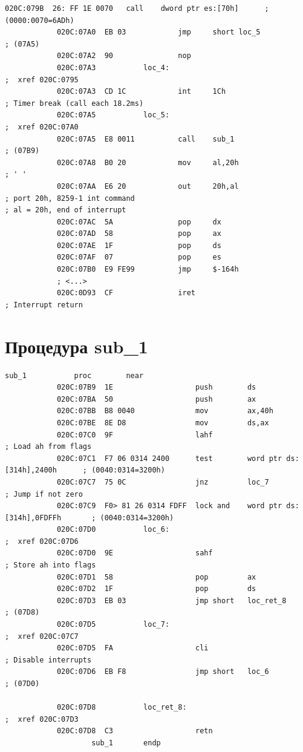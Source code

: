 \documentclass[a4paper, 12pt]{extreport}
\begin{document}
{\begin{lstlisting}[caption={Обработчик прерывания INT 8h}]
			020C:079B  26: FF 1E 0070   call	dword ptr es:[70h]      ; (0000:0070=6ADh)
			020C:07A0  EB 03            jmp		short loc_5             ; (07A5)
			020C:07A2  90               nop
			020C:07A3			loc_4:                                      ;  xref 020C:0795
			020C:07A3  CD 1C            int		1Ch                     ; Timer break (call each 18.2ms)
			020C:07A5			loc_5:                                      ;  xref 020C:07A0
			020C:07A5  E8 0011          call	sub_1                   ; (07B9)
			020C:07A8  B0 20            mov		al,20h                  ; ' '
			020C:07AA  E6 20            out		20h,al                  ; port 20h, 8259-1 int command                                                             ; al = 20h, end of interrupt
			020C:07AC  5A               pop		dx
			020C:07AD  58               pop		ax
			020C:07AE  1F               pop		ds
			020C:07AF  07               pop		es
			020C:07B0  E9 FE99          jmp		$-164h
			; <...>
			020C:0D93  CF               iret                            ; Interrupt return		\end{lstlisting}}
		\section{Процедура sub\_1}
		{\linespread{1.2}
		\noindent\begin{lstlisting}[caption={Процедура sub\_1}]
							sub_1		    proc        near
			020C:07B9  1E                   push        ds
			020C:07BA  50                   push        ax
			020C:07BB  B8 0040              mov         ax,40h
			020C:07BE  8E D8                mov         ds,ax
			020C:07C0  9F                   lahf                                    ; Load ah from flags
			020C:07C1  F7 06 0314 2400      test        word ptr ds:[314h],2400h	  ; (0040:0314=3200h)
			020C:07C7  75 0C                jnz	        loc_7			                  ; Jump if not zero
			020C:07C9  F0> 81 26 0314 FDFF  lock and	word ptr ds:[314h],0FDFFh	    ; (0040:0314=3200h)
			020C:07D0			loc_6:						                                        ;  xref 020C:07D6
			020C:07D0  9E                   sahf                                    ; Store ah into flags
			020C:07D1  58                   pop         ax
			020C:07D2  1F                   pop         ds
			020C:07D3  EB 03                jmp short   loc_ret_8		                ; (07D8)
			020C:07D5			loc_7:                                                    ;  xref 020C:07C7
			020C:07D5  FA                   cli                                     ; Disable interrupts
			020C:07D6  EB F8                jmp short   loc_6                       ; (07D0)
			
			020C:07D8			loc_ret_8:                                                ;  xref 020C:07D3
			020C:07D8  C3                   retn
			        sub_1       endp		
		\end{lstlisting}}
\end{document}

